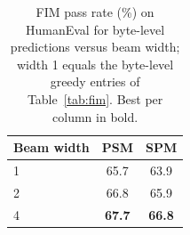 \begin{table}[t]
\caption{FIM pass rate (\%) on HumanEval for byte-level predictions versus beam width; width 1 equals the byte-level greedy entries of Table~\ref{tab:fim}. Best per column in bold.}
\label{tab:beam}
\begin{center}
\begin{tabular}{lcc}
\toprule
Beam width & PSM & SPM \\
\midrule
1 & 65.7 & 63.9 \\
2 & 66.8 & 65.9 \\
4 & \textbf{67.7} & \textbf{66.8} \\
\bottomrule
\end{tabular}
\end{center}
\end{table}
